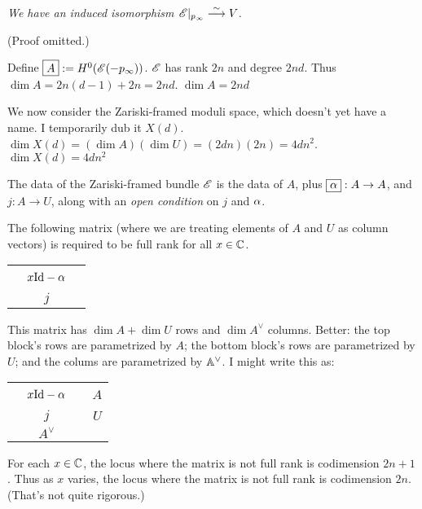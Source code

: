 {
{\em We have an induced isomorphism ${\mathscr{E}}|_{p_{\infty}} \overset \sim \longrightarrow V$.}

(Proof omitted.)


Define $\boxed{A}  := H^0({\mathscr{E}}(-p_\infty))$.   ${\mathscr{E}}$ has rank $2n$ and degree $2nd$.
Thus $\dim A = 2n(d-1) + 2n = 2nd$.   $\boxed{\boxed{\dim A = 2nd}}$

\point We now consider the Zariski-framed moduli space, which doesn't yet have a name. I temporarily dub it $\boxed{X(d)}$.  $\dim X(d)  = (\dim A)(\dim U)= (2dn)(2n)=4dn^2$. $\boxed{\boxed{\dim X(d) = 4dn^2}}$\label{s:dimXd}

\point The data of the Zariski-framed bundle ${\mathscr{E}}$ is the data of $A$, plus $\boxed{\alpha}: A \rightarrow A$, and $\boxed{j}:A \rightarrow U$,
along with an {\em open condition} on $j$ and $\alpha$.

The following matrix (where we are treating elements of $A$ and $U$  as column vectors) is required
to be full rank for all $x \in \mathbb{C}$.

\begin{tabular}{|ccc|}
  \hline
  & &  \\
  & $x \rm{Id}-\alpha$ &  \\
  & &  \\
\hline
& $j$ &  \\
\hline
\end{tabular}
This matrix has $\dim A + \dim U$ rows and $\dim A^\vee$ columns.  Better:  the top block's rows are parametrized by $A$; the bottom block's rows are parametrized by $U$; and the colums are parametrized by $\mathbb{A}^\vee$.  I might write this as:


\begin{tabular}{|ccc|c}
  \hline
  & & & \\
  & $x \rm{Id}-\alpha$ & & $A$ \\
  & & & \\
\hline
& $j$ & & $U$ \\
\hline
& $A^\vee$ & &  \\
\end{tabular}



For each $x \in \mathbb{C}$, the locus where the matrix is not full rank is codimension $2n+1$.
Thus as $x$ varies, the locus where the matrix is not full rank is codimension $\boxed{\boxed{2n}}$.
(That's not quite rigorous.)


}

